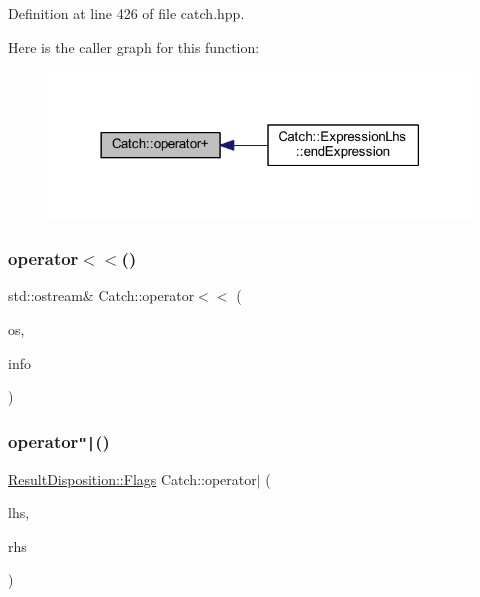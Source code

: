 Definition at line 426 of file catch.\+hpp.

Here is the caller graph for this function\+:\nopagebreak
\begin{figure}[H]
\begin{center}
\leavevmode
\includegraphics[width=318pt]{namespace_catch_a5e95b3c47a7618db3649dc39b0bb9004_icgraph}
\end{center}
\end{figure}
\hypertarget{namespace_catch_a6ec18b5054d7fdfdde861c580b082995}{}\label{namespace_catch_a6ec18b5054d7fdfdde861c580b082995} 
\subsubsection{\texorpdfstring{operator$<$$<$()}{operator<<()}}
{\footnotesize\ttfamily std\+::ostream\& Catch\+::operator$<$$<$ (\begin{DoxyParamCaption}\item[{std\+::ostream \&}]{os,  }\item[{\hyperlink{struct_catch_1_1_source_line_info}{Source\+Line\+Info} const \&}]{info }\end{DoxyParamCaption})}

\hypertarget{namespace_catch_ab32a083e442cc09f736327d2e2865999}{}\label{namespace_catch_ab32a083e442cc09f736327d2e2865999} 
\subsubsection{\texorpdfstring{operator\texttt{"|}()}{operator|()}}
{\footnotesize\ttfamily \hyperlink{struct_catch_1_1_result_disposition_a3396cad6e2259af326b3aae93e23e9d8}{Result\+Disposition\+::\+Flags} Catch\+::operator$\vert$ (\begin{DoxyParamCaption}\item[{\hyperlink{struct_catch_1_1_result_disposition_a3396cad6e2259af326b3aae93e23e9d8}{Result\+Disposition\+::\+Flags}}]{lhs,  }\item[{\hyperlink{struct_catch_1_1_result_disposition_a3396cad6e2259af326b3aae93e23e9d8}{Result\+Disposition\+::\+Flags}}]{rhs }\end{DoxyParamCaption})\hspace{0.3cm}{\ttfamily [inline]}}



